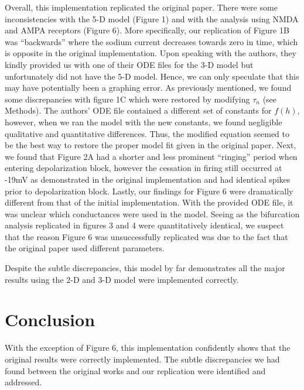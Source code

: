 Overall, this implementation replicated the original paper. There were some inconsistencies with the 5-D model (Figure 1) and with the analysis using NMDA and AMPA receptors (Figure 6). More specifically, our replication of Figure 1B was “backwards” where the sodium current decreases towards zero in time, which is opposite in the original implementation. Upon speaking with the authors, they kindly provided us with one of their ODE files for the 3-D model but unfortunately did not have the 5-D model. Hence, we can only speculate that this may have potentially been a graphing error. As previously mentioned, we found some discrepancies with figure 1C which were restored by modifying $\tau_n$  (see Methods). The authors’ ODE file contained a different set of constants for $f(h)$, however, when we ran the model with the new constants, we found negligible qualitative and quantitative differences.  Thus, the modified equation seemed to be the best way to restore the proper model fit given in the original paper. Next, we found that Figure 2A had a shorter and less prominent “ringing” period when entering depolarization block, however the cessation in firing still occurred at -19mV as demonstrated in the original implementation and had identical spikes prior to depolarization block. Lastly, our findings for Figure 6 were dramatically different from that of the initial implementation. With the provided ODE file, it was unclear which conductances were used in the model. Seeing as the bifurcation analysis replicated in figures 3 and 4 were quantitatively identical, we suspect that the reason Figure 6 was unsuccessfully replicated was due to the fact that the original paper used different parameters.

Despite the subtle discrepancies, this model by far demonstrates all the major results using the 2-D and 3-D model were implemented correctly. 

\section{Conclusion}

With the exception of Figure 6, this implementation confidently shows that the original results were correctly implemented. The subtle discrepancies we had found between the original works and our replication were identified and addressed.  
